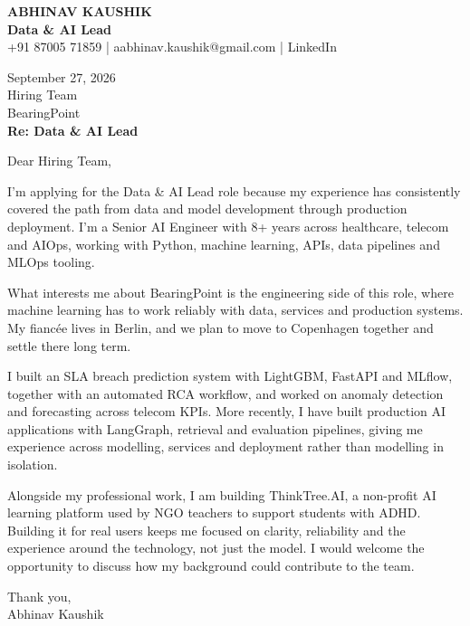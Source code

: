\documentclass[10pt,a4paper]{article}
\begin{document}
\begin{center}
{\Large\bfseries ABHINAV KAUSHIK}\\[2pt]
{\bfseries Data \& AI Lead}\\[2pt]
+91 87005 71859 \quad | \quad aabhinav.kaushik@gmail.com \quad | \quad LinkedIn
\end{center}
\vspace{8pt}
September 27, 2026\\[6pt]
Hiring Team\\
BearingPoint\\[4pt]
\textbf{Re: Data \& AI Lead}

Dear Hiring Team,

I’m applying for the Data \& AI Lead role because my experience has consistently covered the path from data and model development through production deployment. I’m a Senior AI Engineer with 8+ years across healthcare, telecom and AIOps, working with Python, machine learning, APIs, data pipelines and MLOps tooling.

What interests me about BearingPoint is the engineering side of this role, where machine learning has to work reliably with data, services and production systems. My fiancée lives in Berlin, and we plan to move to Copenhagen together and settle there long term.

I built an SLA breach prediction system with LightGBM, FastAPI and MLflow, together with an automated RCA workflow, and worked on anomaly detection and forecasting across telecom KPIs. More recently, I have built production AI applications with LangGraph, retrieval and evaluation pipelines, giving me experience across modelling, services and deployment rather than modelling in isolation.

Alongside my professional work, I am building ThinkTree.AI, a non-profit AI learning platform used by NGO teachers to support students with ADHD. Building it for real users keeps me focused on clarity, reliability and the experience around the technology, not just the model. I would welcome the opportunity to discuss how my background could contribute to the team.

Thank you,\\
Abhinav Kaushik
\end{document}
